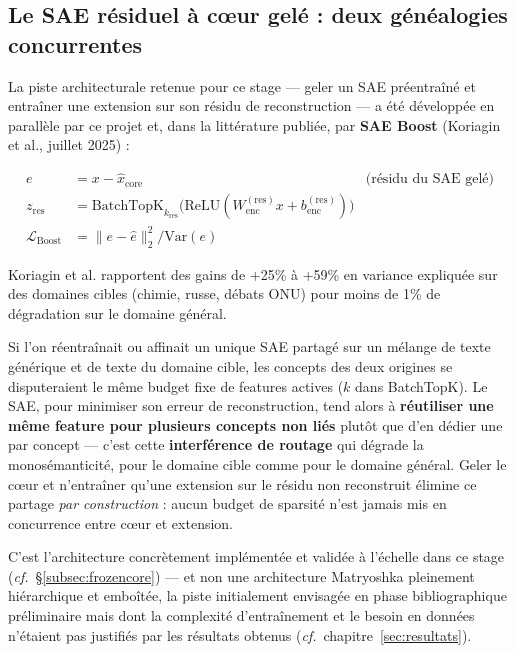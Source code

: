 \documentclass[11pt]{article}
\newcommand{\Var}{\mathrm{Var}}
\begin{document}
\subsection{Le SAE résiduel à cœur gelé : deux généalogies concurrentes}
\label{subsec:sae-boost-litt}

La piste architecturale retenue pour ce stage --- geler un SAE préentraîné et
entraîner une extension sur son résidu de reconstruction --- a été développée
en parallèle par ce projet et, dans la littérature publiée, par
\textbf{SAE Boost} \cite{koriagin2025saeboost} (Koriagin et al., juillet 2025) :

\begin{align*}
  e &= x - \hat{x}_\text{core} & \text{(résidu du SAE gelé)} \\
  z_\text{res} &= \text{BatchTopK}_{k_\text{res}}\bigl(\text{ReLU}(W_\text{enc}^{(\text{res})} x + b_\text{enc}^{(\text{res})})\bigr) \\
  \mathcal{L}_\text{Boost} &= \|e - \hat{e}\|_2^2 / \Var(e)
\end{align*}

Koriagin et al. rapportent des gains de +25\% à +59\% en variance expliquée
sur des domaines cibles (chimie, russe, débats ONU) pour moins de 1\% de
dégradation sur le domaine général.

\begin{definitionbox}
Si l'on réentraînait ou affinait un unique SAE partagé sur un mélange de texte
générique et de texte du domaine cible, les concepts des deux origines se
disputeraient le même budget fixe de features actives ($k$ dans BatchTopK).
Le SAE, pour minimiser son erreur de reconstruction, tend alors à
\textbf{réutiliser une même feature pour plusieurs concepts non liés} plutôt
que d'en dédier une par concept --- c'est cette \textbf{interférence de
routage} qui dégrade la monosémanticité, pour le domaine cible comme pour le
domaine général. Geler le cœur et n'entraîner qu'une extension sur le résidu
non reconstruit élimine ce partage \emph{par construction} : aucun budget de
sparsité n'est jamais mis en concurrence entre cœur et extension.
\end{definitionbox}

C'est l'architecture concrètement implémentée et
validée à l'échelle dans ce stage (\emph{cf.}~\S\ref{subsec:frozencore}) ---
et non une architecture Matryoshka pleinement hiérarchique et emboîtée, la
piste initialement envisagée en phase bibliographique préliminaire mais dont
la complexité d'entraînement et le besoin en données n'étaient pas justifiés
par les résultats obtenus (\emph{cf.}~chapitre~\ref{sec:resultats}).
\end{document}
